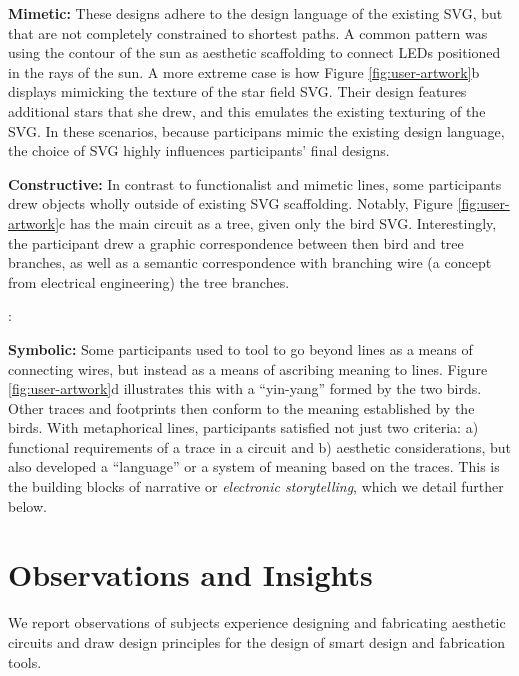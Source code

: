 \documentclass{sigchi}
\begin{document}
  \textbf{Mimetic:}
  These designs adhere to the design language of the existing SVG, but that are not completely constrained to shortest paths. A common pattern was using the contour of the sun as aesthetic scaffolding to connect LEDs positioned in the rays of the sun. A more extreme case is how Figure \ref{fig:user-artwork}b displays mimicking the texture of the star field SVG. Their design features additional stars that she drew, and this emulates the existing texturing of the SVG. In these scenarios, because participans mimic the existing design language, the choice of SVG highly influences participants' final designs.
  
  \textbf{Constructive:} In contrast to functionalist and mimetic lines, some participants drew objects wholly outside of existing SVG scaffolding. Notably, Figure \ref{fig:user-artwork}c has the main circuit as a tree, given only the bird SVG. Interestingly, the participant drew a graphic correspondence between then bird and tree branches, as well as a semantic correspondence with branching wire (a concept from electrical engineering) the tree branches.

  \begin{myquote}
  \vspace{-2pt}
    :
    \vspace{-2pt}
  \end{myquote}
  
  \textbf{Symbolic:} Some participants used to tool to go beyond lines as a means of connecting wires, but instead as a means of ascribing meaning to lines. Figure \ref{fig:user-artwork}d illustrates this with a ``yin-yang'' formed by the two birds. Other traces and footprints then conform to the meaning established by the birds. With metaphorical lines, participants satisfied not just two criteria: a) functional requirements of a trace in a circuit and b) aesthetic considerations, but also developed a ``language'' or a system of meaning based on the traces.
  This is the building blocks of narrative or \textit{electronic storytelling}, which we detail further below.
 

\section{Observations and Insights}
  We report observations of subjects experience designing and fabricating aesthetic circuits and draw design principles for the design of smart design and fabrication tools. 
  
\end{document}
